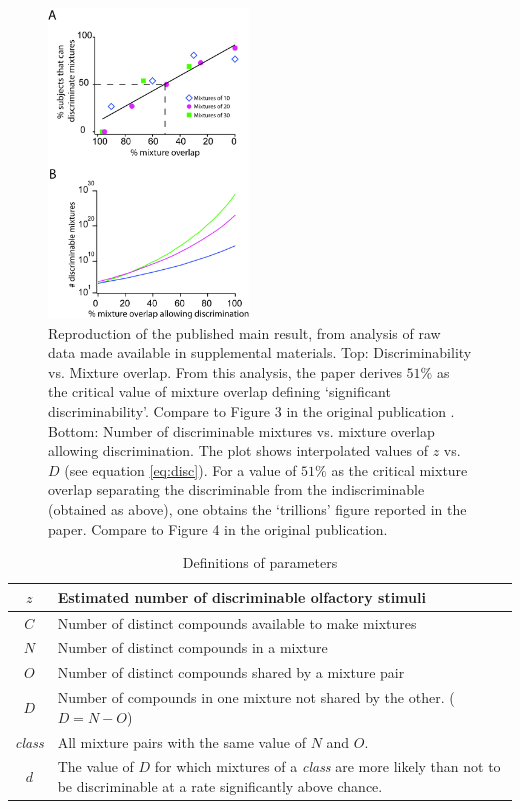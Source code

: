 \documentclass[letterpaper,twocolumn,10pt]{article}
\begin{document}
\begin{figure}
    \centering
    \includegraphics[width=0.475\textwidth]{figures/Fig2_Reconstruction}
    \caption{
Reproduction of the published main result, 
from analysis of raw data made available in supplemental materials. 
Top: Discriminability vs. Mixture overlap. 
From this analysis, the paper derives $51\%$ as the critical value of mixture overlap defining ‘significant discriminability’. 
Compare to Figure 3 in the original publication \cite{bushdid_humans_2014}. 
Bottom: Number of discriminable mixtures vs. mixture overlap allowing discrimination. 
The plot shows interpolated values of $z$ vs. $D$ (see equation \ref{eq:disc}). 
For a value of $51\%$ as the critical mixture overlap separating the discriminable from the indiscriminable (obtained as above), 
one obtains the `trillions' figure reported in the paper. 
Compare to Figure 4 in the original publication.}
    \label{fig:reconstruction}
\end{figure}

\begin{table}
\caption{Definitions of parameters}
\label{table:definitions}
\begin{tabulary}{0.5\textwidth}{| c | p{6.5cm} |}
\hline
$z$ & Estimated number of discriminable olfactory stimuli \\
\hline
$C$ & Number of distinct compounds available to make mixtures \\
\hline
$N$ & Number of distinct compounds in a mixture \\
\hline
$O$ & Number of distinct compounds shared by a mixture pair \\
\hline
$D$ & Number of compounds in one mixture not shared by the other.  ($D = N-O$) \\
\hline
\emph{class} & All mixture pairs with the same value of $N$ and $O$. \\
\hline
$d$ & The value of $D$ for which mixtures of a \emph{class} are more likely than not to be discriminable at a rate significantly above chance. \\
\hline
\end{tabulary}
\end{table}
\end{document}
